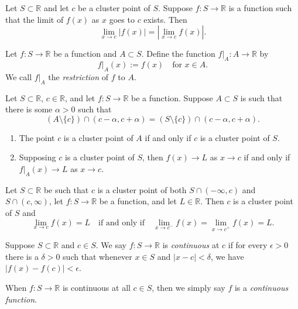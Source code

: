 \documentclass[../main.tex]{subfiles}
\begin{document}
    \begin{proposition}
        Let $S \subset \mathbb{R}$ and let $c$ be a cluster point of $S$. Suppose $f : S \to \mathbb{R}$ is a function such that the limit of $f(x)$ as $x$ goes to $c$ exists. Then
        \[
        \lim_{x\to c} |f(x)| = \left| \lim_{x\to c} f(x) \right|.
        \]
    \end{proposition}
        
    \begin{definition}
        Let $f : S \to \mathbb{R}$ be a function and $A \subset S$. Define the function $f|_A : A \to \mathbb{R}$ by
        \[
        f|_A(x) := f(x) \quad \text{for } x \in A.
        \]
        We call $f|_A$ the \textit{restriction} of $f$ to $A$.
    \end{definition}
        
    \begin{proposition}
        Let $S \subset \mathbb{R}$, $c \in \mathbb{R}$, and let $f : S \to \mathbb{R}$ be a function. Suppose $A \subset S$ is such that there is some $\alpha > 0$ such that
        \[
        (A \setminus \{c\}) \cap (c - \alpha, c + \alpha) = (S \setminus \{c\}) \cap (c - \alpha, c + \alpha).
        \]
    \begin{enumerate}
        \item The point $c$ is a cluster point of $A$ if and only if $c$ is a cluster point of $S$.
        \item Supposing $c$ is a cluster point of $S$, then $f(x) \to L$ as $x \to c$ if and only if $f|_A(x) \to L$ as $x \to c$.
    \end{enumerate}
    \end{proposition}
        
    \begin{proposition}
        Let $S \subset \mathbb{R}$ be such that $c$ is a cluster point of both $S \cap (-\infty, c)$ and $S \cap (c, \infty)$, let $f : S \to \mathbb{R}$ be a function, and let $L \in \mathbb{R}$. Then $c$ is a cluster point of $S$ and
        \[
        \lim_{x\to c} f(x) = L \quad \text{if and only if} \quad \lim_{x\to c^-} f(x) = \lim_{x\to c^+} f(x) = L.
        \]
    \end{proposition}
        
    \begin{definition}
        Suppose $S \subset \mathbb{R}$ and $c \in S$. We say $f : S \to \mathbb{R}$ is \textit{continuous} at $c$ if for every $\epsilon > 0$ there is a $\delta > 0$ such that whenever $x \in S$ and $|x - c| < \delta$, we have $|f(x) - f(c)| < \epsilon$.
        
        When $f : S \to \mathbb{R}$ is continuous at all $c \in S$, then we simply say $f$ is a \textit{continuous function}.
    \end{definition}
        
\end{document}
